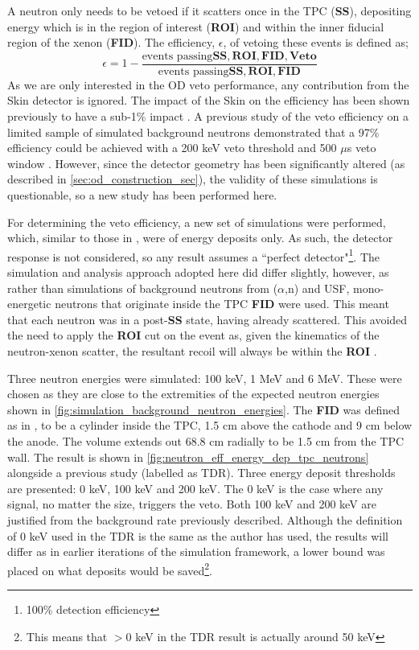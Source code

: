 \par
A neutron only needs to be vetoed if it scatters once in the TPC (\textbf{SS}), depositing energy which is in the region of interest (\textbf{ROI}) and within the inner fiducial region of the xenon (\textbf{FID}).
The efficiency, $\epsilon$, of vetoing these events is defined as;
\begin{equation}
    \epsilon = 1 - \frac{\text{events passing}\mathbf{SS, ROI, FID, Veto}}{\text{events passing}\mathbf{SS, ROI, FID}}
    \label{eq:neutron_efficiency}
\end{equation}
As we are only interested in the OD veto performance, any contribution from the Skin detector is ignored.
The impact of the Skin on the efficiency has been shown previously to have a sub-1\% impact \cite{sallyshaw_thesis_ref}.
A previous study of the veto efficiency on a limited sample of simulated background neutrons demonstrated that a 97\% efficiency could be achieved with a 200 keV veto threshold and 500 $\mu$s veto window \cite{LZ_TechnicalDesignReview_ref}.
However, since the detector geometry has been significantly altered (as described in \autoref{sec:od_construction_sec}), the validity of these simulations is questionable, so a new study has been performed here.
\par
For determining the veto efficiency, a new set of simulations were performed, which, similar to those in \cite{LZ_TechnicalDesignReview_ref}, were of energy deposits only.
As such, the detector response is not considered, so any result assumes a ``perfect detector"\footnote{100\% detection efficiency}.
The simulation and analysis approach adopted here did differ slightly, however, as rather than simulations of background neutrons from ($\alpha$,n) and USF, mono-energetic neutrons that originate inside the TPC \textbf{FID} were used.
This meant that each neutron was in a post-\textbf{SS} state, having already scattered.
This avoided the need to apply the \textbf{ROI} cut on the event as, given the kinematics of the neutron-xenon scatter, the resultant recoil will always be within the \textbf{ROI} \cite{xenon100_neutrons_ref}.
\par
Three neutron energies were simulated: 100 keV, 1 MeV and 6 MeV.
These were chosen as they are close to the extremities of the expected neutron energies shown in \autoref{fig:simulation_background_neutron_energies}.
The \textbf{FID} was defined as in \cite{LZ_TechnicalDesignReview_ref}, to be a cylinder inside the TPC, 1.5 cm above the cathode and 9 cm below the anode.
The volume extends out 68.8 cm radially to be 1.5 cm from the TPC wall.
The result is shown in \autoref{fig:neutron_eff_energy_dep_tpc_neutrons} alongside a previous study (labelled as TDR).
Three energy deposit thresholds are presented: 0 keV, 100 keV and 200 keV.
The 0 keV is the case where any signal, no matter the size, triggers the veto.
Both 100 keV and 200 keV are justified from the background rate previously described.
Although the definition of 0 keV used in the TDR is the same as the author has used, the results will differ as in earlier iterations of the simulation framework, a lower bound was placed on what deposits would be saved\footnote{This means that $>$0 keV in the TDR result is actually around 50 keV}.

